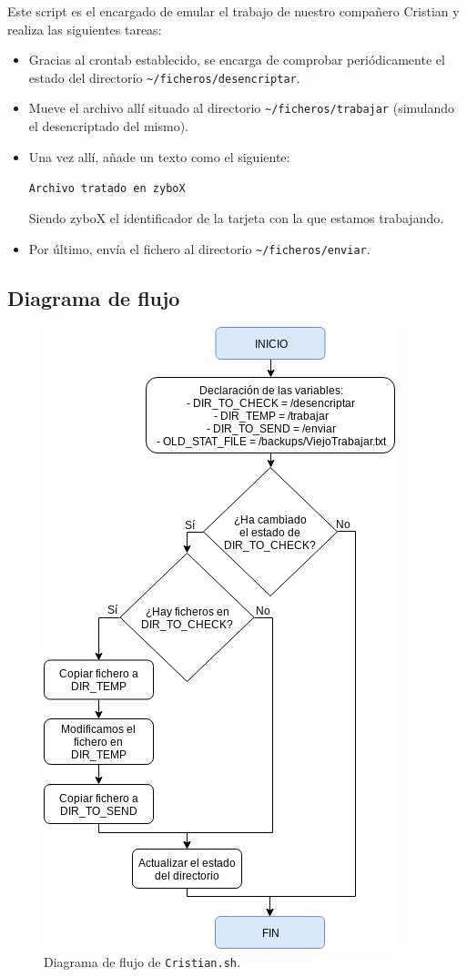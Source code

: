 Este script es el encargado de emular el trabajo de nuestro compañero Cristian y realiza las siguientes tareas:
\begin{itemize}
	\item Gracias al crontab establecido, se encarga de comprobar periódicamente el estado del directorio \texttt{\textasciitilde/ficheros/desencriptar}.
	\item Mueve el archivo allí situado al directorio \texttt{\textasciitilde/ficheros/trabajar} (simulando el desencriptado del mismo).
	\item Una vez allí, añade un texto como el siguiente:
	\begin{center}
		\texttt{Archivo tratado en zyboX}
	\end{center}	
	Siendo zyboX el identificador de la tarjeta con la que estamos trabajando.
	\item Por último, envía el fichero al directorio \texttt{\textasciitilde/ficheros/enviar}.
\end{itemize}

\newpage
\subsection{Diagrama de flujo}
\begin{figure}[h]
	\centering
	\includegraphics[scale=0.7]{Anexos/Anexo3/Diagramas/Cristian.png}
	\caption{Diagrama de flujo de \texttt{Cristian.sh}.}
	\label{Diagrama de flujo de Cristian.sh}
\end{figure}

